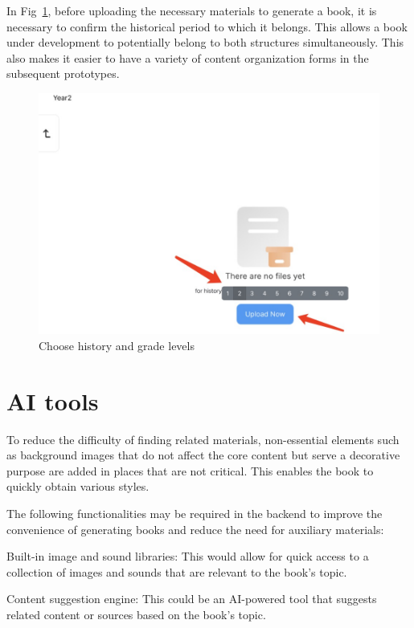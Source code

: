 In Fig~\ref{s-2}, before uploading the necessary materials to generate a book, it is necessary to confirm the historical period to which it belongs. This allows a book under development to potentially belong to both structures simultaneously. This also makes it easier to have a variety of content organization forms in the subsequent prototypes.

\begin{figure}[htbp]
  \centerline{\includegraphics[width=500pt]{images/s-2.jpg}}
  \caption{Choose history and grade levels}
  \label{s-2}
\end{figure}

\section{AI tools}

To reduce the difficulty of finding related materials, non-essential elements such as background images that do not affect the core content but serve a decorative purpose are added in places that are not critical. This enables the book to quickly obtain various styles.

The following functionalities may be required in the backend to improve the convenience of generating books and reduce the need for auxiliary materials:

Built-in image and sound libraries: This would allow for quick access to a collection of images and sounds that are relevant to the book's topic.

Content suggestion engine: This could be an AI-powered tool that suggests related content or sources based on the book's topic.

